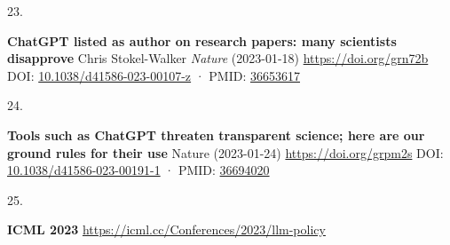 \documentclass[
]{article}
\newlength{\cslhangindent}
\newlength{\csllabelwidth}
\newlength{\cslentryspacingunit} %
\newenvironment{CSLReferences}[2] %
 {%
  \setlength{\parindent}{0pt}
  \ifodd #1
  \let\oldpar\par
  \def\par{\hangindent=\cslhangindent\oldpar}
  \fi
  \setlength{\parskip}{#2\cslentryspacingunit}
 }%
 {}
\newcommand{\CSLBlock}[1]{#1\hfill\break}
\newcommand{\CSLLeftMargin}[1]{\parbox[t]{\csllabelwidth}{#1}}
\newcommand{\CSLRightInline}[1]{\parbox[t]{\linewidth - \csllabelwidth}{#1}\break}
\begin{document}
\begin{CSLReferences}{0}{0}
\leavevmode{}%
\CSLLeftMargin{23. }%
\CSLRightInline{\textbf{ChatGPT listed as author on research papers: many scientists disapprove}
\CSLBlock{Chris Stokel-Walker} \emph{Nature} (2023-01-18) \url{https://doi.org/grn72b}
\CSLBlock{DOI: \href{https://doi.org/10.1038/d41586-023-00107-z}{10.1038/d41586-023-00107-z} · PMID: \href{https://www.ncbi.nlm.nih.gov/pubmed/36653617}{36653617}}}

\leavevmode{}%
\CSLLeftMargin{24. }%
\CSLRightInline{\textbf{Tools such as ChatGPT threaten transparent science; here are our ground rules for their use}
\CSLBlock{Nature} (2023-01-24) \url{https://doi.org/grpm2s}
\CSLBlock{DOI: \href{https://doi.org/10.1038/d41586-023-00191-1}{10.1038/d41586-023-00191-1} · PMID: \href{https://www.ncbi.nlm.nih.gov/pubmed/36694020}{36694020}}}

\leavevmode{}%
\CSLLeftMargin{25. }%
\CSLRightInline{\textbf{ICML 2023} \url{https://icml.cc/Conferences/2023/llm-policy}}

\end{CSLReferences}
\end{document}
